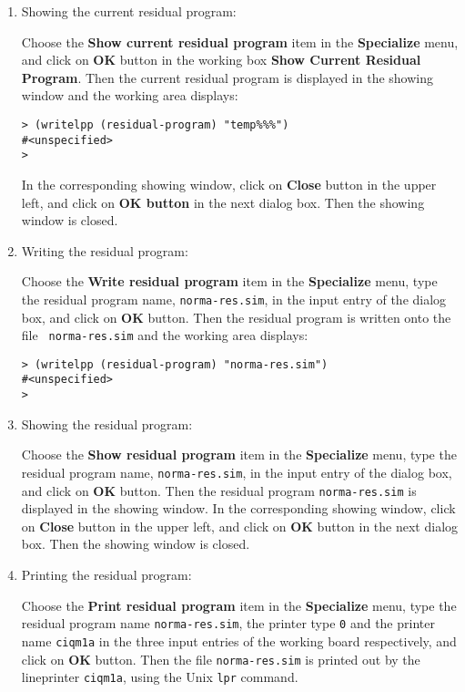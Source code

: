 \begin{sloppypar}
\begin{enumerate}
\item Showing the current residual program:

    Choose the {\bf Show current residual program} item in the {\bf
Specialize} menu, and click on {\bf OK} button in the working box {\bf
Show Current Residual Program}. Then the current residual program is
displayed in the showing window and the working area displays:

\begin{verbatim}
> (writelpp (residual-program) "temp%%%")
#<unspecified>
>
\end{verbatim}

    In the corresponding showing window, click on {\bf Close} button
in the upper left, and click on {\bf OK button} in the next dialog
box. Then the showing window is closed.

\item Writing the residual program:

    Choose the {\bf Write residual program} item in the {\bf
Specialize} menu, type the residual program name, {\tt norma-res.sim},
in the input entry of the dialog box, and click on {\bf OK}
button. Then the residual program is written onto the file {\tt
norma-res.sim} and the working area displays:

\begin{verbatim}
> (writelpp (residual-program) "norma-res.sim")
#<unspecified>
>
\end{verbatim}

\item Showing the residual program:

    Choose the {\bf Show residual program} item in the {\bf
Specialize} menu, type the residual program name, {\tt norma-res.sim},
in the input entry of the dialog box, and click on {\bf OK}
button. Then the residual program {\tt norma-res.sim} is displayed in
the showing window. In the corresponding showing window, click on {\bf
Close} button in the upper left, and click on {\bf OK} button in the
next dialog box. Then the showing window is closed.

\item Printing the residual program:

    Choose the {\bf Print residual program} item in the {\bf
Specialize} menu, type the residual program name {\tt norma-res.sim},
the printer type {\tt 0} and the printer name {\tt ciqm1a} in the
three input entries of the working board respectively, and click on
{\bf OK} button. Then the file {\tt norma-res.sim} is printed out by
the lineprinter {\tt ciqm1a}, using the Unix {\tt lpr} command.


\end{enumerate}
\end{sloppypar}

